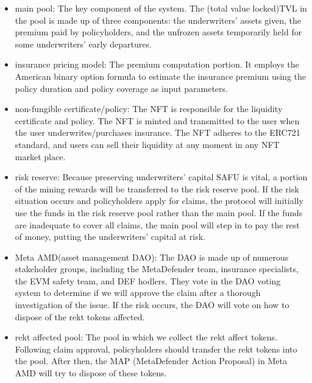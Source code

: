 \begin{itemize}
    \item main pool: The key component of the system.
	The (total value locked)TVL in the pool is made up of three components: the underwriters' assets given, the premium paid by policyholders, and the unfrozen assets temporarily held for some underwriters' early departures.
	\item insurance pricing model: The premium computation portion.
	It employs the American binary option formula to estimate the insurance premium using the policy duration and policy coverage as input parameters.
	\item non-fungible certificate/policy: The NFT is responsible for the liquidity certificate and policy.
	The NFT is minted and transmitted to the user when the user underwrites/purchases insurance.
	The NFT adheres to the ERC721 standard, and users can sell their liquidity at any moment in any NFT market place.
	\item risk reserve: Because preserving underwriters' capital SAFU is vital, a portion of the mining rewards will be transferred to the risk reserve pool.
	If the risk situation occurs and policyholders apply for claims, the protocol will initially use the funds in the risk reserve pool rather than the main pool.
	If the funds are inadequate to cover all claims, the main pool will step in to pay the rest of money, putting the underwriters' capital at risk.
	\item Meta AMD(asset management DAO): The DAO is made up of numerous stakeholder groups, including the MetaDefender team, insurance specialists, the EVM safety team, and DEF hodlers.
	They vote in the DAO voting system to determine if we will approve the claim after a thorough investigation of the issue.
	If the risk occurs, the DAO will vote on how to dispose of the rekt tokens affected.
	\item rekt affected pool: The pool in which we collect the rekt affect tokens.
	Following claim approval, policyholders should transfer the rekt tokens into the pool.
	After then, the MAP (MetaDefender Action Proposal) in Meta AMD will try to dispose of these tokens.
\end{itemize}
